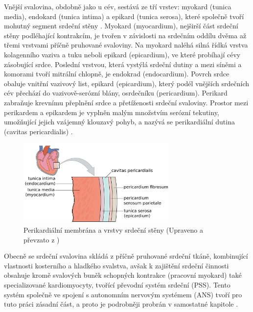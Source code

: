 Vnější svalovina, obdobně jako u cév, sestává ze tří vrstev: myokard (tunica
media), endokard (tunica intima) a epikard (tunica serosa), které společně tvoří
mohutný segment srdeční stěny \cite{Memorix2017}. Myokard (myocardium), nejširší
část srdeční stěny podléhající kontrakcím, je tvořen v závislosti na srdečním
oddílu dvěma až třemi vrstvami příčně pruhované svaloviny. Na myokard naléhá
silná řídká vrstva kolagenního vaziva a tuku neboli epikard (epicardium), ve
které probíhají cévy zásobující srdce. Poslední vrstvou, která vystýlá srdeční
dutiny a mezi síněmi a komorami tvoří mitrální chlopně, je endokrad
(endocardium). Povrch srdce obaluje vnitřní vazivový list, epikard (epicardium),
který podél vnějších srdečních cév přechází do vazivově-serózní blány,
osrdečníku (pericardium). Perikard zabraňuje krevnímu přeplnění srdce a
přetíženosti srdeční svaloviny. Prostor mezi perikardem a epikardem je vyplněn
malým množstvím serózní tekutiny, umožňující jejich vzájemný klouzavý pohyb, a
nazývá se perikardiální dutina (cavitas pericardialis)
\cite{Weinhaus2005,Dylevsky2013}.

\begin{figure}[h]
	\begin{center}
		\includegraphics[width=0.7\textwidth]{../assets/anatomy/heart_muscle}
		\caption{Perikardiální membrána a vrstvy srdeční stěny (Upraveno a
			převzato z \cite{OpenStax})}
		\label{fig:heartlayers}
	\end{center}
\end{figure}

Obecně se srdeční svalovina skládá z příčně pruhované srdeční tkáně, kombinující
vlastnosti kosterního a hladkého svalstva, avšak k zajištění srdeční činnosti
obsahuje kromě svalových buněk schopných kontrakce (pracovní myokard) také
specializované kardiomyocyty, tvořící převodní systém srdeční (PSS). Tento
systém společně ve spojení s autonomním nervovým systémem (ANS) tvoří pro tuto
práci zásadní část, a proto je podrobněji probrán v samostatné kapitole
\cite{Memorix2017,Dylevsky2013}.

